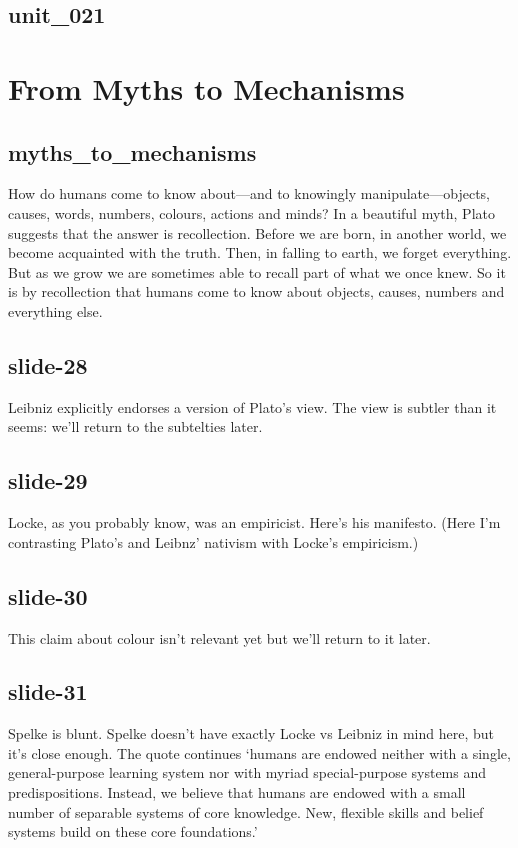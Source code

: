\documentclass[12pt,\papersize]{extarticle}
\begin{document}
 
\subsection{unit\_021}
 
\section{From Myths to Mechanisms}
 
 
\subsection{myths\_to\_mechanisms}
How do humans come to know about---and to knowingly manipulate---objects, causes, words, numbers, colours, actions and minds?
In a beautiful myth, Plato suggests that the answer is recollection.
Before we are born, in another world, we become acquainted with the truth.
Then, in falling to earth, we forget everything.
But as we grow we are sometimes able to recall part of what we once knew.
So it is by recollection that humans come to know about objects, causes, numbers and everything else.
 
 
\subsection{slide-28}
Leibniz explicitly endorses a version of Plato's view.
The view is subtler than it seems: we'll return to the subtelties later.
 
 
\subsection{slide-29}
Locke, as you probably know, was an empiricist. Here's his manifesto.
(Here I'm contrasting Plato's and Leibnz' nativism with Locke's empiricism.)
 
 
\subsection{slide-30}
This claim about colour isn't relevant yet but we'll return to it later.
 
 
\subsection{slide-31}
Spelke is blunt.
Spelke doesn't have exactly Locke vs Leibniz in mind here, but it's close enough.
The quote continues ‘humans are endowed neither with a single, general-purpose learning system nor with myriad special-purpose systems and predispositions. Instead, we believe that humans are endowed with a small number of separable systems of core knowledge. New, flexible skills and belief systems build on these core foundations.’
 
\end{document}
